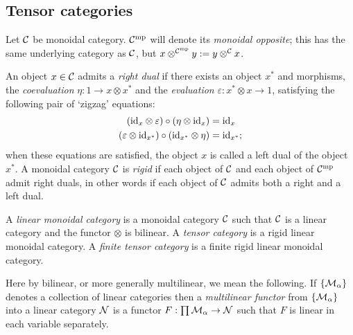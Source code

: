 \documentclass{amsart}
\begin{document}
\subsection{Tensor categories}


Let $\mathcal C$ be monoidal category. $\mathcal C^{\mathrm{mp}}$ will denote its {\em monoidal opposite}; this has the same underlying category as $\mathcal C$, but $x \otimes^{\mathcal C^{\mathrm{mp}}} y : = y \otimes^{\mathcal C} x$. 

\begin{definition} \label{def:rigid}
	An object $x \in \mathcal C$ admits a {\em right dual} if there exists an object $x^*$ and morphisms, the {\em coevaluation} $\eta: 1 \to x \otimes x^*$ and the {\em evaluation} $\varepsilon: x^* \otimes x \to 1$, satisfying the following pair of `zigzag' equations:
	\begin{align*}
		(\mathrm{id}_{x} \otimes \varepsilon  ) \circ (  \eta \otimes \mathrm{id}_{x}) &= \mathrm{id}_{x} \\
		(\varepsilon \otimes \mathrm{id}_{x^*}) \circ (\mathrm{id}_{x^*} \otimes \eta) &= \mathrm{id}_{x^*};
	\end{align*}
	when these equations are satisfied, the object $x$ is called a left dual of the object $x^*$.  A monoidal category $\mathcal C$ is {\em rigid} if each object of $\mathcal C$ and each object of $\mathcal C^{\mathrm{mp}}$ admit right duals, in other words if each object of $\mathcal C$ admits both a right and a left dual. 
\end{definition}



\begin{definition}
	A {\em linear monoidal category} is a monoidal category $\mathcal C$ such that $\mathcal C$ is a linear category and the functor $\otimes$ is bilinear.  A {\em tensor category} is a rigid linear monoidal category.  A {\em finite tensor category} is a finite rigid linear monoidal category.
\end{definition}

\nid Here by bilinear, or more generally multilinear, we mean the following.  If $\{\mathcal M_\alpha\}$ denotes a collection of linear categories then a {\em multilinear functor} from $\{\mathcal M_\alpha\}$ into a linear category $\mathcal N$ is a functor $F: \prod \mathcal M_\alpha \to \mathcal N$ such that $F$ is linear in each variable separately. 


\end{document}

